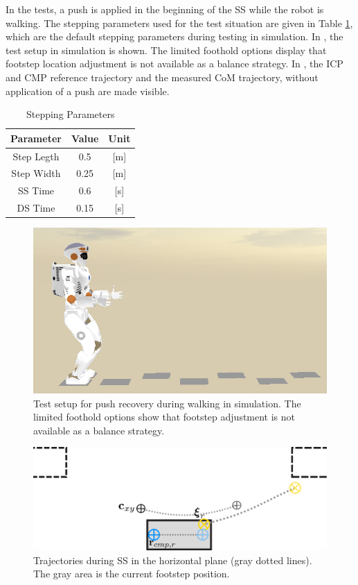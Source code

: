 In the tests, a push is applied in the beginning of the \ac{SS} while the robot is walking. The stepping parameters used for the test situation are given in Table \ref{tab:stepping}, which are the default stepping parameters during testing in simulation. In , the test setup in simulation is shown. The limited foothold options display that footstep location adjustment is not available as a balance strategy. In , the \ac{ICP} and \ac{CMP} reference trajectory and the measured \ac{CoM} trajectory, without application of a push are made visible. 
\begin{table}[ht]
\caption{Stepping Parameters} %
\centering %
\begin{tabular}{c c c } %
\hline\hline %
Parameter & Value & Unit \\
\hline %
Step Legth & 0.5 &  [m]\\
Step Width & 0.25 & [m]\\
\acs{SS} Time & 0.6 & [s]\\
\acs{DS} Time & 0.15 & [s]\\
\hline %
\end{tabular}
\label{tab:stepping} %
\end{table}
\begin{figure}[h]
\centering
  \includegraphics[width=.8\linewidth]{STYLESTUFF/valwalkingtest.png}
   \caption{Test setup for push recovery during walking in simulation. The limited foothold options show that footstep adjustment is not available as a balance strategy.}
    \label{fig:valwalkingtest}
\end{figure}
\begin{figure}[h]
\centering
  \includegraphics[width=.8\linewidth]{STYLESTUFF/ICPplan3StepComICPrSS.png}
   \caption{Trajectories during \ac{SS} in the horizontal plane (gray dotted lines). The gray area is the current footstep position.}
    \label{fig:3foot}
\end{figure}

